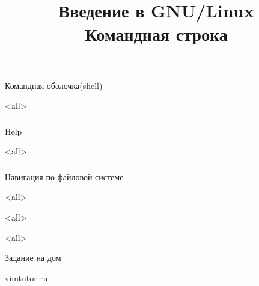 
\title{Введение в GNU/Linux\\Командная строка}


\begin{frame}
 \frametitle{}
 \titlepage
\end{frame}
\begin{frame}
\frametitle{}
 \begin{center}
   {\Large Командная оболочка(shell) }
 \end{center}
\end{frame}
\mode<all>{}
\begin{frame}
\frametitle{}
 \begin{center}
   {\Large Help }
 \end{center}
\end{frame}
\mode<all>{}
\begin{frame}
\frametitle{}
 \begin{center}
   {\Large Навигация по файловой системе }
 \end{center}
\end{frame}
\mode<all>{}

\mode<all>{}

\mode<all>{}


\begin{frame}{Задание на дом}
\begin{block}{}
vimtutor ru
\end{block}
\end{frame}



